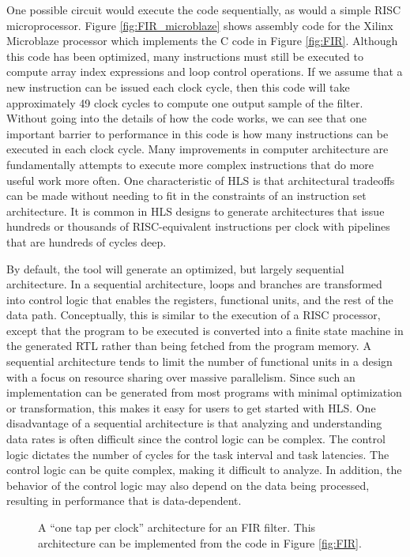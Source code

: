 One possible circuit would execute the code sequentially, as would a simple RISC microprocessor.  Figure \ref{fig:FIR_microblaze} shows assembly code for the Xilinx Microblaze processor which implements the C code in Figure \ref{fig:FIR}.  Although this code has been optimized, many instructions must still be executed to compute array index expressions and loop control operations.  If we assume that a new instruction can be issued each clock cycle, then this code will take approximately 49 clock cycles to compute one output sample of the filter.  Without going into the details of how the code works, we can see that one important barrier to performance in this code is how many instructions can be executed in each clock cycle.  Many improvements in computer architecture are fundamentally attempts to execute more complex instructions that do more useful work more often.  One characteristic of HLS is that architectural tradeoffs can be made without needing to fit in the constraints of an instruction set architecture.  It is common in HLS designs to generate architectures that issue hundreds or thousands of RISC-equivalent instructions per clock with pipelines that are hundreds of cycles deep.

By default, the \VHLS tool will generate an optimized, but largely sequential architecture.   In a sequential architecture, loops and branches are transformed into control logic that enables the registers, functional units, and the rest of the data path.  Conceptually, this is similar to the execution of a RISC processor, except that the program to be executed is converted into a finite state machine in the generated RTL rather than being fetched from the program memory.   A sequential architecture tends to limit the number of functional units in a design with a focus on resource sharing over massive parallelism.  Since such an implementation can be generated from most programs with minimal optimization or transformation, this makes it easy for users to get started with HLS.  One disadvantage of a sequential architecture is that analyzing and understanding data rates is often difficult since the control logic can be complex.  The control logic dictates the number of cycles for the task interval and task latencies. The control logic can be quite complex, making it difficult to analyze. In addition, the behavior of the control logic may also depend on the data being processed, resulting in performance that is data-dependent.

\begin{figure}
\centering
\mbox{}

\mbox{}
\caption{A ``one tap per clock'' architecture for an FIR filter.  This architecture can be implemented from the code in Figure \ref{fig:FIR}.}
\label{fig:FIR_sequential}
\end{figure}

